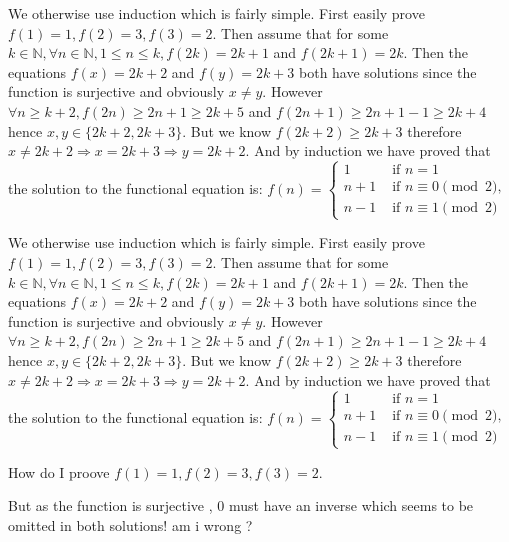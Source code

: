 \begin{solution}
	We otherwise use induction which is fairly simple.
First easily prove $f(1)=1, f(2)=3, f(3)=2$. 
Then assume that for some $k \in \mathbb{N} , \forall n \in \mathbb{N}, 1 \le n \le k, f(2k)=2k+1$ and $f(2k+1)=2k$.
Then the equations $f(x)=2k+2$ and $f(y)=2k+3$ both have solutions since the function is surjective and obviously $x \neq y$.
However $\forall n \ge k+2, f(2n) \ge 2n+1 \ge 2k+5$ and $f(2n+1) \ge 2n+1-1\ge 2k+4$ hence $x,y \in \{2k+2,2k+3\}$. But we know $f(2k+2) \ge 2k+3$ therefore $x \neq 2k+2 \Rightarrow x=2k+3 \Rightarrow y=2k+2$.
And by induction we have proved that the solution to the functional equation is:
$ f(n)=\begin{cases}1 &\textrm{ if } n=1\\ n+1 &\textrm{ if } n \equiv 0\pmod 2,\\ n-1 &\textrm{ if } n \equiv 1\pmod 2\end{cases} $
\end{solution}



\begin{solution}
	\begin{tcolorbox}We otherwise use induction which is fairly simple.
First easily prove $f(1)=1, f(2)=3, f(3)=2$. 
Then assume that for some $k \in \mathbb{N} , \forall n \in \mathbb{N}, 1 \le n \le k, f(2k)=2k+1$ and $f(2k+1)=2k$.
Then the equations $f(x)=2k+2$ and $f(y)=2k+3$ both have solutions since the function is surjective and obviously $x \neq y$.
However $\forall n \ge k+2, f(2n) \ge 2n+1 \ge 2k+5$ and $f(2n+1) \ge 2n+1-1\ge 2k+4$ hence $x,y \in \{2k+2,2k+3\}$. But we know $f(2k+2) \ge 2k+3$ therefore $x \neq 2k+2 \Rightarrow x=2k+3 \Rightarrow y=2k+2$.
And by induction we have proved that the solution to the functional equation is:
$ f(n)=\begin{cases}1 &\textrm{ if } n=1\\ n+1 &\textrm{ if } n \equiv 0\pmod 2,\\ n-1 &\textrm{ if } n \equiv 1\pmod 2\end{cases} $\end{tcolorbox}

How do I proove $f(1)=1, f(2)=3, f(3)=2$.
\end{solution}



\begin{solution}
	But as the function is surjective , $0$ must have an inverse which seems to be omitted in both solutions! am i wrong ?
\end{solution}




